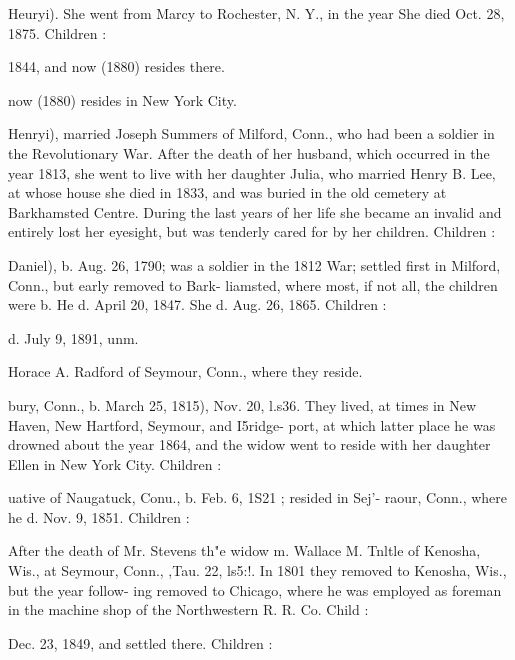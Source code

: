 \documentclass[oneside]{book}
\begin{document}
Heuryi). She went from Marcy to Rochester, N. Y., in the year 
She died Oct. 28, 1875. Children : 


1844, and now (1880) resides there. 


now (1880) resides in New York City. 

Henryi), married Joseph Summers of Milford, Conn., who had 
been a soldier in the Revolutionary War. After the death of her 
husband, which occurred in the year 1813, she went to live with 
her daughter Julia, who married Henry B. Lee, at whose house she 
died in 1833, and was buried in the old cemetery at Barkhamsted 
Centre. During the last years of her life she became an invalid 
and entirely lost her eyesight, but was tenderly cared for by her 
children. Children : 




Daniel), b. Aug. 26, 1790; was a soldier in the 1812 War; 
settled first in Milford, Conn., but early removed to Bark- 
liamsted, where most, if not all, the children were b. He d. 
April 20, 1847. She d. Aug. 26, 1865. Children : 



d. July 9, 1891, unm. 




Horace A. Radford of Seymour, Conn., where they 
reside. 


bury, Conn., b. March 25, 1815), Nov. 20, l.s36. They lived, 
at times in New Haven, New Hartford, Seymour, and I5ridge- 
port, at which latter place he was drowned about the year 
1864, and the widow went to reside with her daughter Ellen 
in New York City. Children : 









uative of Naugatuck, Conu., b. Feb. 6, 1S21 ; resided in Sej'- 
raour, Conn., where he d. Nov. 9, 1851. Children : 




After the death of Mr. Stevens th"e widow m. Wallace M. 
Tnltle of Kenosha, Wis., at Seymour, Conn., ,Tau. 22, ls5:!. 
In 1801 they removed to Kenosha, Wis., but the year follow- 
ing removed to Chicago, where he was employed as foreman 
in the machine shop of the Northwestern R. R. Co. Child : 



Dec. 23, 1849, and settled there. Children : 
\end{document}
